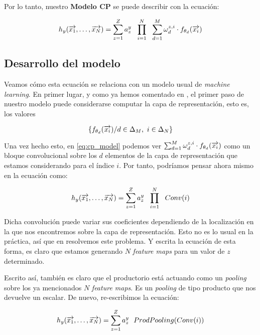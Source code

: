 Por lo tanto, nuestro \textbf{Modelo CP} se puede describir con la ecuación:

\begin{equation} \label{eq:cp_model}
    h_y(\overrightarrow{x_1}, \ldots, \overrightarrow{x_N}) =  \sum_{z = 1}^Z a_z^y \ \  \prod_{i = 1}^N \ \  \sum_{d = 1}^{M} \omega^{z, i}_d \cdot f_{\theta_{d}}(\overrightarrow{x_i})
\end{equation}

\subsection{Desarrollo del modelo}

Veamos cómo esta ecuación se relaciona con un modelo usual de \textit{machine learning}. En primer lugar, y como ya hemos comentado en , el primer paso de nuestro modelo puede considerarse computar la capa de representación, esto es, los valores

$$\{f_{\theta_d}(\overrightarrow{x_i}) / d \in \Delta_{M},\ i \in \Delta_{N} \}$$

Una vez hecho esto, en \eqref{eq:cp_model} podemos ver $\sum_{d = 1}^{M} \omega^{z, i}_d \cdot f_{\theta_{d}}(\overrightarrow{x_i})$ como un bloque convolucional sobre los $d$ elementos de la capa de representación que estamos considerando para el índice $i$. Por tanto, podríamos pensar ahora mismo en la ecuación como:

\begin{equation}
    h_y(\overrightarrow{x_1}, \ldots, \overrightarrow{x_N}) =  \sum_{z = 1}^Z a_z^y \ \  \prod_{i = 1}^N \ \  Conv(i)
\end{equation}

Dicha convolución puede variar sus coeficientes dependiendo de la localización en la que nos encontremos sobre la capa de representación. Esto no es lo usual en la práctica, así que en  resolvemos este problema. Y escrita la ecuación de esta forma, es claro que estamos generando $N$ \textit{feature maps} para un valor de $z$ determinado.

Escrito así, también es claro que el productorio está actuando como un \textit{pooling} sobre los ya mencionados $N$ \textit{feature maps}. Es un \textit{pooling} de tipo producto que nos devuelve un escalar. De nuevo, re-escribimos la ecuación:

\begin{equation}
    h_y(\overrightarrow{x_1}, \ldots, \overrightarrow{x_N}) =  \sum_{z = 1}^Z a_z^y \ \  ProdPooling( Conv(i) )
\end{equation}

